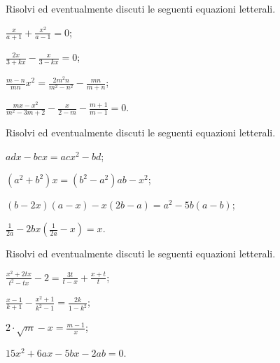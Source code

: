 \begin{esercizio}[\Ast]
 \label{ese:3.60}
Risolvi ed eventualmente discuti le seguenti equazioni letterali.
\begin{multicols}{2}
\begin{enumeratea}
\item $\frac{x}{a + 1} + \frac{x^{2}}{a-1} = 0$;
\item $\frac{2 x}{3 + k x}-\frac{x}{3-k x}=0$;
\item $\frac{m-n}{m n} x^{2}=\frac{2 m^{2} n}{m^{2}-n^{2}}-\frac{m n}{m + n}$;
\item $\frac{m x-x^{2}}{m^{2}-3 m + 2}-\frac{x}{2-m} -\frac{m + 1}{m-1}=0$.
\end{enumeratea}
\end{multicols}
\end{esercizio}

\begin{esercizio}[\Ast]
 \label{ese:3.61} %
Risolvi ed eventualmente discuti le seguenti equazioni letterali.
\begin{enumeratea}
\item $adx-bcx=acx^{2}-bd$;
\item $\left(a^{2}+b^{2}\right)x=\left(b^{2}-a^{2}\right)ab-x^{2}$;
\item $(b-2x)(a-x)-x(2b-a)=a^{2}-5b(a-b)$;
\item $\frac{1}{2a}-2bx\left(\frac{1}{2a}-x\right)=x$.
\end{enumeratea}
\end{esercizio}

\begin{esercizio}[\Ast]
 \label{ese:3.62}
Risolvi ed eventualmente discuti le seguenti equazioni letterali.
\begin{multicols}{2}
\begin{enumeratea}
\item $\frac{x^{2} + 2 t x}{t^{2}-t x}-2=\frac{3 t}{t-x}+ \frac{x + t}{t}$;
\item $\frac{x-1}{k + 1}-\frac{x^{2} + 1}{k^{2}-1} =\frac{2 k}{1-k^{2}}$;
\item $2 \cdot \sqrt{m}-x=\frac{m-1}{x}$;
\item $15x^{2}+6ax-5bx-2ab=0$. %
\end{enumeratea}
\end{multicols}
\end{esercizio}

